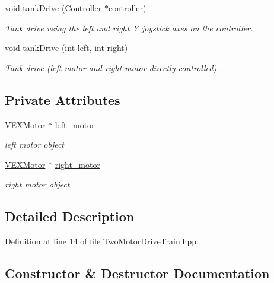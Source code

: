 \begin{DoxyCompactItemize}
void \hyperlink{class_two_motor_drive_train_a6a94c7396365b9ce4c09519a967f6111}{tank\+Drive} (\hyperlink{class_controller}{Controller} $\ast$controller)
\begin{DoxyCompactList}\small\item\em Tank drive using the left and right Y joystick axes on the controller. \end{DoxyCompactList}\item 
void \hyperlink{class_two_motor_drive_train_ad9bb9cd0e5841e7f3b6d8284b613d97f}{tank\+Drive} (int left, int right)
\begin{DoxyCompactList}\small\item\em Tank drive (left motor and right motor directly controlled). \end{DoxyCompactList}\end{DoxyCompactItemize}
\subsection*{Private Attributes}
\begin{DoxyCompactItemize}
\item 
\hyperlink{class_v_e_x_motor}{V\+E\+X\+Motor} $\ast$ \hyperlink{class_two_motor_drive_train_a134c95e1f45a5156924208cddaa3661f}{left\+\_\+motor}
\begin{DoxyCompactList}\small\item\em left motor object \end{DoxyCompactList}\item 
\hyperlink{class_v_e_x_motor}{V\+E\+X\+Motor} $\ast$ \hyperlink{class_two_motor_drive_train_a0bdefa7c731c2407ad4a4dad0902bbd3}{right\+\_\+motor}
\begin{DoxyCompactList}\small\item\em right motor object \end{DoxyCompactList}\end{DoxyCompactItemize}


\subsection{Detailed Description}


Definition at line 14 of file Two\+Motor\+Drive\+Train.\+hpp.



\subsection{Constructor \& Destructor Documentation}
\mbox{\label{class_two_motor_drive_train_a9ae44c21661482476a71f4a2e9ea0c97}} 
